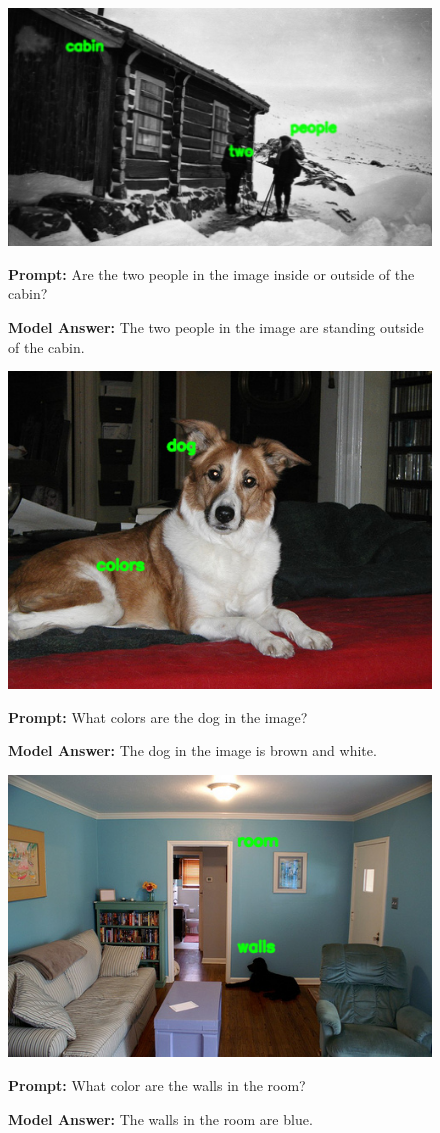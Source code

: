 \documentclass[11pt]{article}
\begin{document}
\begin{figure}[H]
    \centering
    \includegraphics[width=0.6\linewidth]{reordering_15.png}\par
    \vspace{1em}
    \raggedright
    \textbf{Prompt:} Are the two people in the image inside or outside of the cabin?
    
    \textbf{Model Answer:} The two people in the image are standing outside of the cabin.
    \label{fig:qwen_loss_plot}
\end{figure}

\begin{figure}[H]
    \centering
    \includegraphics[width=0.6\linewidth]{reordering_230.png}\par
    \vspace{1em}
    \raggedright
    \textbf{Prompt:} What colors are the dog in the image?
    
    \textbf{Model Answer:} The dog in the image is brown and white.
\end{figure}

\begin{figure}[H]
    \centering
    \includegraphics[width=0.6\linewidth]{reordering_179.png}\par
    \vspace{1em}
    \raggedright
    \textbf{Prompt:} What color are the walls in the room?
    
    \textbf{Model Answer:} The walls in the room are blue.
\end{figure}
\end{document}
